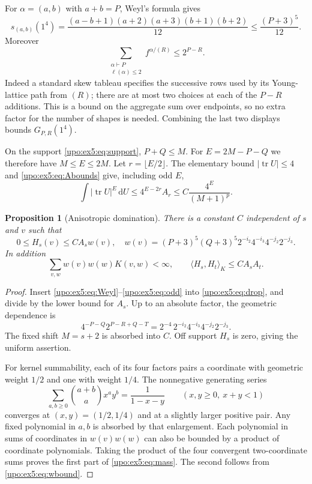 \documentclass[11pt,letterpaper]{article}
\newtheorem{proposition}[theorem]{Proposition}
\theoremstyle{remark}\newtheorem{remark}[theorem]{Remark}
\numberwithin{equation}{section}
\newcommand{\tr}{\operatorname{tr}}
\newcommand{\dd}{\,\mathrm d}
\newcommand{\pair}[2]{\langle #1,#2\rangle_K}
\begin{document}
For $\alpha=(a,b)$ with $a+b=P$, Weyl's formula gives
\begin{equation}\label{upo:ex5:eq:Weyl}
 s_{(a,b)}(1^4)
  =\frac{(a-b+1)(a+2)(a+3)(b+1)(b+2)}{12}
  \le\frac{(P+3)^5}{12}.
\end{equation}
Moreover
\begin{equation}\label{upo:ex5:eq:pathbound}
 \sum_{\substack{\alpha\vdash P\\\ell(\alpha)\le2}}
 f^{\alpha/(R)}\le2^{P-R}.
\end{equation}
Indeed a standard skew tableau specifies the successive rows used
by its Young-lattice path from $(R)$; there are at most two choices
at each of the $P-R$ additions. This is a bound on the aggregate
sum over endpoints, so no extra factor for the number of shapes is
needed. Combining the last two displays bounds $G_{P,R}(1^4)$.

On the support \eqref{upo:ex5:eq:support}, $P+Q\le M$.
For $E=2M-P-Q$ we therefore have $M\le E\le2M$.
Let $r=\lfloor E/2\rfloor$. The elementary bound $|\tr U|\le4$
and \eqref{upo:ex5:eq:Abounds} give, including odd $E$,
\begin{equation}\label{upo:ex5:eq:odd}
 \int|\tr U|^E\dd U
   \le4^{E-2r}A_r
   \le C\frac{4^E}{(M+1)^p}.
\end{equation}

\begin{proposition}[Anisotropic domination]\label{upo:ex5:prop:weight}
There is a constant $C$ independent of $s$ and $v$ such that
\begin{equation}\label{upo:ex5:eq:wbound}
 0\le H_s(v)\le C A_s w(v),
 \quad
 w(v)=(P+3)^5(Q+3)^5
 2^{-i_2}4^{-i_3}4^{-j_2}2^{-j_3}.
\end{equation}
In addition
\begin{equation}\label{upo:ex5:eq:mass}
 \sum_{v,w}w(v)w(w)K(v,w)<\infty,
 \qquad \pair{H_s}{H_t}\le C A_sA_t.
\end{equation}
\end{proposition}
\begin{proof}
Insert \eqref{upo:ex5:eq:Weyl}--\eqref{upo:ex5:eq:odd} into \eqref{upo:ex5:eq:drop},
and divide by the lower bound for $A_s$. Up to an absolute factor,
the geometric dependence is
\[
 4^{-P-Q}2^{P-R+Q-T}
 =2^{-4}\,2^{-i_2}4^{-i_3}4^{-j_2}2^{-j_3}.
\]
The fixed shift $M=s+2$ is absorbed into $C$.
Off support $H_s$ is zero, giving the uniform assertion.

For kernel summability, each of its four factors pairs a coordinate
with geometric weight $1/2$ and one with weight $1/4$.
The nonnegative generating series
\begin{equation}\label{upo:ex5:eq:kernelgf}
 \sum_{a,b\ge0}\binom{a+b}{a}x^a y^b=\frac1{1-x-y}
 \qquad(x,y\ge0,\ x+y<1)
\end{equation}
converges at $(x,y)=(1/2,1/4)$ and at a slightly larger positive
pair. Any fixed polynomial in $a,b$ is absorbed by that enlargement.
Each polynomial in sums of coordinates in $w(v)w(w)$ can also be
bounded by a product of coordinate polynomials. Taking the product
of the four convergent two-coordinate sums proves the first part of
\eqref{upo:ex5:eq:mass}. The second follows from \eqref{upo:ex5:eq:wbound}.
\end{proof}
\end{document}
